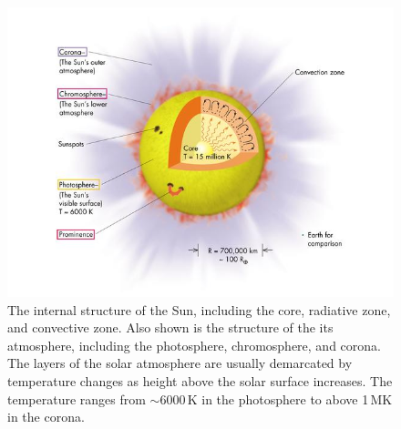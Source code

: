

\begin{figure}[!h]
\begin{center}
\includegraphics[trim = 0cm 0.5cm 0cm 0cm, width=1.0\textwidth]{images/solar_atmosphere}
\caption{The internal structure of the Sun, including the core, radiative zone, and convective zone.  Also shown is the structure of the its atmosphere, including the photosphere, chromosphere, and corona. The layers of the solar atmosphere are usually demarcated by temperature changes as height above the solar surface increases. The temperature ranges from $\sim$6000\,K in the photosphere to above 1\,MK in the corona.}
\label{fig:solar_atmosphere} 
\end{center}
\end{figure}



